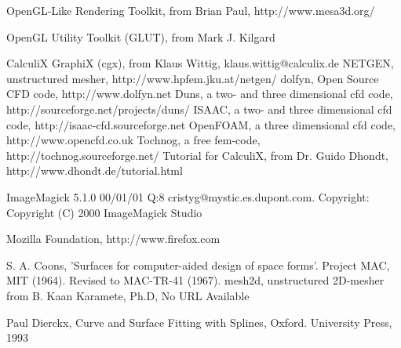 \documentclass{article}
\begin{document}
\begin{thebibliography}{99}

 OpenGL-Like Rendering Toolkit, from Brian Paul, http://www.mesa3d.org/ 

 OpenGL Utility Toolkit (GLUT), from Mark J. Kilgard

 CalculiX GraphiX (cgx), from Klaus Wittig, klaus.wittig@calculix.de
 NETGEN, unstructured mesher, http://www.hpfem.jku.at/netgen/
 dolfyn, Open Source CFD code, http://www.dolfyn.net
 Duns, a two- and three dimensional cfd code, http://sourceforge.net/projects/duns/
  ISAAC, a two- and three dimensional cfd code, http://isaac-cfd.sourceforge.net
 OpenFOAM, a three dimensional cfd code, http://www.opencfd.co.uk
 Tochnog, a free fem-code, http://tochnog.sourceforge.net/
 Tutorial for CalculiX, from Dr. Guido Dhondt, http://www.dhondt.de/tutorial.html

 ImageMagick 5.1.0 00/01/01 Q:8 cristyg@mystic.es.dupont.com. Copyright: Copyright (C) 2000 ImageMagick Studio 

 Mozilla Foundation, http://www.firefox.com

 S. A. Coons, 'Surfaces for computer-aided design of space forms'. Project MAC, MIT (1964). Revised to MAC-TR-41 (1967). 
 mesh2d, unstructured 2D-mesher from B. Kaan Karamete, Ph.D, No URL Available

 Paul Dierckx, Curve and Surface Fitting with Splines, Oxford. University Press, 1993

\end{thebibliography}
\end{document}
